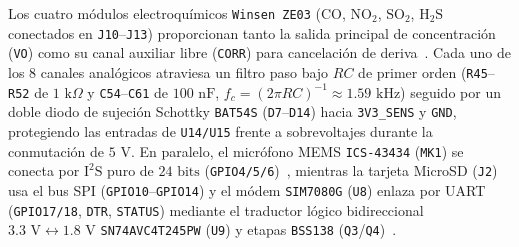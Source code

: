 \documentclass[conference]{IEEEtran}
\begin{document}
Los cuatro módulos electroquímicos \texttt{Winsen ZE03} ($\text{CO}$, $\text{NO}_2$, $\text{SO}_2$, $\text{H}_2\text{S}$ conectados en \texttt{J10}--\texttt{J13}) proporcionan tanto la salida principal de concentración (\texttt{VO}) como su canal auxiliar libre (\texttt{CORR}) para cancelación de deriva~\cite{winsen2019ze03}. Cada uno de los 8 canales analógicos atraviesa un filtro paso bajo $RC$ de primer orden (\texttt{R45}--\texttt{R52} de $1\text{ k}\Omega$ y \texttt{C54}--\texttt{C61} de $100\text{ nF}$, $f_c = (2\pi R C)^{-1} \approx 1.59\text{ kHz}$) seguido por un doble diodo de sujeción Schottky \texttt{BAT54S} (\texttt{D7}--\texttt{D14}) hacia \texttt{3V3\_SENS} y \texttt{GND}, protegiendo las entradas de \texttt{U14/U15} frente a sobrevoltajes durante la conmutación de $5\text{ V}$. En paralelo, el micrófono MEMS \texttt{ICS-43434} (\texttt{MK1}) se conecta por $\text{I}^2\text{S}$ puro de $24\text{ bits}$ (\texttt{GPIO4/5/6})~\cite{invensense2016ics43434}, mientras la tarjeta MicroSD (\texttt{J2}) usa el bus SPI (\texttt{GPIO10}--\texttt{GPIO14}) y el módem \texttt{SIM7080G} (\texttt{U8}) enlaza por UART (\texttt{GPIO17/18}, \texttt{DTR}, \texttt{STATUS}) mediante el traductor lógico bidireccional $3.3\text{ V} \leftrightarrow 1.8\text{ V}$ \texttt{SN74AVC4T245PW} (\texttt{U9}) y etapas \texttt{BSS138} (\texttt{Q3}/\texttt{Q4})~\cite{simcom2021sim7080g}.
\end{document}

